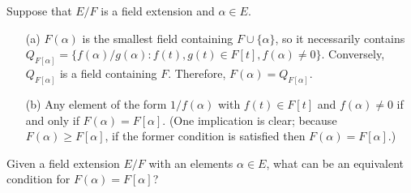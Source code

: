 \begin{obs}
    Suppose that $E/F$ is a field extension and $\alpha\in E$.
    \begin{enumerate}
        \item[(a)]
        {
            $F(\alpha)$ is the smallest field containing $F\cup\{\alpha\}$, so it necessarily contains $Q_{F[\alpha]}=\{f(\alpha)/g(\alpha): f(t), g(t)\in F[t], f(\alpha)\neq 0\}$.
            Conversely, $Q_{F[\alpha]}$ is a field containing $F$.
            Therefore, $F(\alpha)=Q_{F[\alpha]}$.
        }
        \item[(b)]
        {
            Any element of the form $1/f(\alpha)$ with $f(t)\in F[t]$ and $f(\alpha)\neq 0$ if and only if $F(\alpha)=F[\alpha]$.
            (One implication is clear; because $F(\alpha)\geq F[\alpha]$, if the former condition is satisfied then $F(\alpha)=F[\alpha]$.)
        }
    \end{enumerate}
\end{obs}
\begin{qst}\label{qst: rationalizability}
    Given a field extension $E/F$ with an elements $\alpha\in E$, what can be an equivalent condition for $F(\alpha)=F[\alpha]$?
\end{qst}

